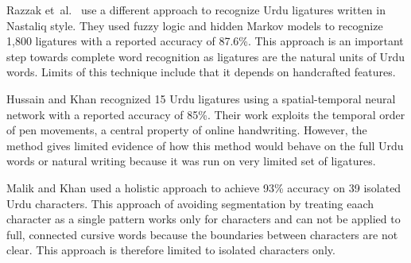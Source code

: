 \documentclass[12pt,a4paper]{report}
\begin{document}
Razzak et~al.\ \cite{razzak2010} use a different approach to recognize Urdu ligatures written in Nastaliq style.
They used fuzzy logic and hidden Markov models to recognize 1,800 ligatures with a reported accuracy of 87.6\%. This approach is an important step towards complete word recognition as ligatures are the natural units of Urdu words. Limits of this technique include that it depends on handcrafted features.

Hussain and Khan \cite{hussain} recognized 15 Urdu ligatures using a spatial-temporal neural network with a reported accuracy of 85\%. Their work exploits the temporal order of pen movements, a central property of online handwriting. However, the method gives limited evidence of how this method would behave on the full Urdu words or natural writing because it was run on very limited set of ligatures.

Malik and Khan \cite{malik} used a holistic approach to achieve 93\% accuracy on 39 isolated Urdu characters. This approach of avoiding segmentation by treating eaach character as a single pattern works only for characters and can not be applied to full, connected cursive words because the boundaries between characters are not clear. This approach is therefore limited to isolated characters only.
\end{document}

